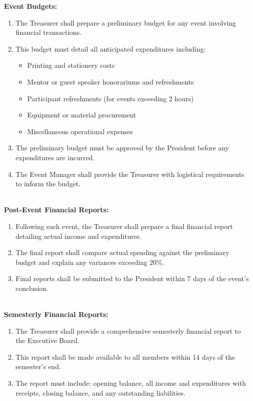 

\textbf{Event Budgets:}
\begin{enumerate}[label=\alph*), leftmargin=2em, itemsep=0.3em]
    \item The Treasurer shall prepare a preliminary budget for any event involving financial transactions.
    \item This budget must detail all anticipated expenditures including:
    \begin{itemize}[leftmargin=1.5em, itemsep=0.2em]
        \item Printing and stationery costs
        \item Mentor or guest speaker honorariums and refreshments
        \item Participant refreshments (for events exceeding 2 hours)
        \item Equipment or material procurement
        \item Miscellaneous operational expenses
    \end{itemize}
    \item The preliminary budget must be approved by the President before any expenditures are incurred.
    \item The Event Manager shall provide the Treasurer with logistical requirements to inform the budget.
\end{enumerate}
\\
\textbf{Post-Event Financial Reports:}
\begin{enumerate}[label=\alph*), leftmargin=2em, itemsep=0.3em]
    \item Following each event, the Treasurer shall prepare a final financial report detailing actual income and expenditures.
    \item The final report shall compare actual spending against the preliminary budget and explain any variances exceeding 20\%.
    \item Final reports shall be submitted to the President within 7 days of the event's conclusion.
\end{enumerate}
\\
\textbf{Semesterly Financial Reports:}
\begin{enumerate}[label=\alph*), leftmargin=2em, itemsep=0.3em]
    \item The Treasurer shall provide a comprehensive semesterly financial report to the Executive Board.
    \item This report shall be made available to all members within 14 days of the semester's end.
    \item The report must include: opening balance, all income and expenditures with receipts, closing balance, and any outstanding liabilities.
\end{enumerate}

